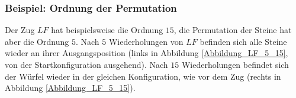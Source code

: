 \documentclass[12pt,a4paper, usenames, dvipsnames]{article}
\theoremstyle{mystyle}
\theoremstyle{definition}
\newcommand{\Ttwo}{2$\times$2$\times$2-}
\begin{document}

\subsubsection*{Beispiel: Ordnung der Permutation}

Der Zug $LF$ hat beispielsweise die Ordnung $15$, die Permutation der Steine hat aber die Ordnung $5$. Nach $5$ Wiederholungen von $LF$ befinden sich alle Steine wieder an ihrer Ausgangsposition (links in Abbildung \ref{Abbildung_LF_5_15}, von der Startkonfiguration ausgehend). Nach $15$ Wiederholungen befindet sich der Würfel wieder in der gleichen Konfiguration, wie vor dem Zug (rechts in Abbildung \ref{Abbildung_LF_5_15}).
\end{document}
